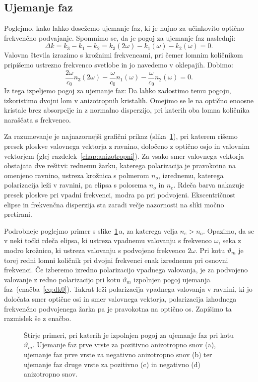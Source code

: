 \subsection*{Ujemanje faz}
Poglejmo, kako lahko dosežemo ujemanje faz, ki je nujno za učinkovito optično
frekvenčno podvajanje. Spomnimo se, da je pogoj za ujemanje faz naslednji:
\begin{equation}
\Delta k = k_3 - k_1 -k_2 = k_3(2\omega) - k_1(\omega) -k_2(\omega) = 0.
\end{equation}
Valovna števila izrazimo s krožnimi frekvencami, pri čemer 
lomnim količnikom pripišemo ustrezno frekvenco svetlobe in jo navedemo v oklepajih. Dobimo:
\begin{equation}
\frac{2\omega}{c_0} n_3(2\omega) - \frac{\omega}{c_0} n_1(\omega)- \frac{\omega}{c_0} n_2(\omega) =0.
\end{equation}
Iz tega izpeljemo pogoj za ujemanje faz:
Da lahko zadostimo temu pogoju, izkoristimo dvojni lom v 
anizotropnih kristalih. Omejimo se le na optično 
enoosne kristale brez absorpcije in z 
normalno disperzijo, pri katerih oba lomna količnika naraščata s frekvenco.  

Za razumevanje je najnazornejši grafični prikaz (slika~\ref{fig:dk}), pri katerem
rišemo presek ploskve valovnega vektorja z ravnino, določeno z optično osjo in valovnim
vektorjem (glej razdelek~\ref{chap:anizotropni}). 
Za vsako smer valovnega vektorja obstajata dve rešitvi:
rednemu žarku, katerega polarizacija je pravokotna na omenjeno ravnino,
ustreza krožnica s polmerom $n_o$, izrednemu, katerega polarizacija leži v ravnini, 
pa elipsa s polosema $n_o$ in $n_e$. 
Rdeča barva nakazuje presek ploskve pri vpadni frekvenci, modra pa pri podvojeni. 
Ekscentričnost elipse in frekvenčna disperzija sta zaradi večje nazornosti na sliki 
močno pretirani. 
\newpage

Podrobneje poglejmo primer s slike~\ref{fig:dk}\,a, za katerega velja $n_e>n_o$. 
Opazimo, da se v neki točki rdeča elipsa, ki ustreza vpadnemu valovanju s frekvenco $\omega$, 
seka z modro krožnico, ki ustreza valovanju s podvojeno frekvenco $2\omega$. Pri kotu 
$\vartheta_m$ je torej redni lomni 
količnik pri dvojni frekvenci enak izrednemu pri osnovni
frekvenci. Če izberemo izredno polarizacijo vpadnega valovanja, je za podvojeno 
valovanje z redno polarizacijo pri kotu $\vartheta_m$ izpolnjen pogoj ujemanja 
faz~(enačba~\ref{eq:dk0}). Takrat leži polarizacija vpadnega valovanja v ravnini,
ki jo določata smer optične osi in smer valovnega vektorja, polarizacija 
izhodnega frekvenčno podvojenega žarka pa 
je pravokotna na optično os. Zapišimo ta razmislek še z enačbo.
\begin{figure}[ht]
\centering
\def\svgwidth{128truemm} 

\caption{Štirje primeri, pri katerih je izpolnjen pogoj za ujemanje faz pri kotu $\vartheta_m$. 
Ujemanje faz prve vrste za pozitivno anizotropno snov (a), 
ujemanje faz prve vrste za negativno anizotropno snov (b) ter 
ujemanje faz druge vrste za pozitivno (c) in negativno (d) anizotropno snov.}
\label{fig:dk}
\end{figure}

